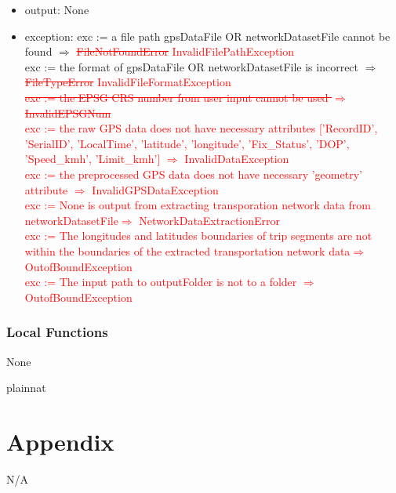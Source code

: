 \documentclass[12pt, titlepage]{article}
\begin{document}
\begin{itemize}
\item output: None 
\item exception: exc := a file path gpsDataFile OR networkDatasetFile cannot be found $\Rightarrow$  \textcolor{red}{\sout{FileNotFoundError} InvalidFilePathException} \\
  exc := the format of gpsDataFile OR networkDatasetFile is incorrect $\Rightarrow$  \textcolor{red}{\sout{FileTypeError} InvalidFileFormatException}\\
  \textcolor{red}{\sout{exc := the EPSG CRS number from user input cannot be used $\Rightarrow$  InvalidEPSGNum}}\\
  \textcolor{red}{exc := the raw GPS data does not have necessary attributes ['RecordID', 'SerialID', 'LocalTime', 'latitude', 'longitude', 'Fix\_Status', 'DOP', 'Speed\_kmh', 'Limit\_kmh'] $\Rightarrow$ InvalidDataException}\\
  \textcolor{red}{exc := the preprocessed GPS data does not have necessary 'geometry' attribute $\Rightarrow$ InvalidGPSDataException}\\
  \textcolor{red}{exc := None is output from extracting transporation network data from networkDatasetFile$\Rightarrow$ NetworkDataExtractionError}\\
  \textcolor{red}{exc := The longitudes and latitudes boundaries of trip segments are not within the boundaries of the extracted transportation network data$\Rightarrow$ OutofBoundException}\\
  \textcolor{red}{exc := The input path to outputFolder is not to a folder $\Rightarrow$ OutofBoundException}\\
\end{itemize}



\subsubsection{Local Functions} None



\newpage

 {plainnat}


\newpage

\section{Appendix} \label{Appendix}
N/A
\end{document}
